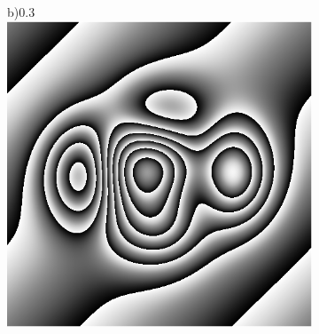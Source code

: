 \documentclass[letterpaper,12pt]{article}   %
\begin{document}
\begin{figure}[htp]
	\begin{center}
	\centering
		\begin{subfigure}(b){0.3\textwidth}
			\includegraphics[scale=0.5]{figures/faseRST.png}
		\end{subfigure}
		\\

\end{center}
\end{figure}
\end{document}

